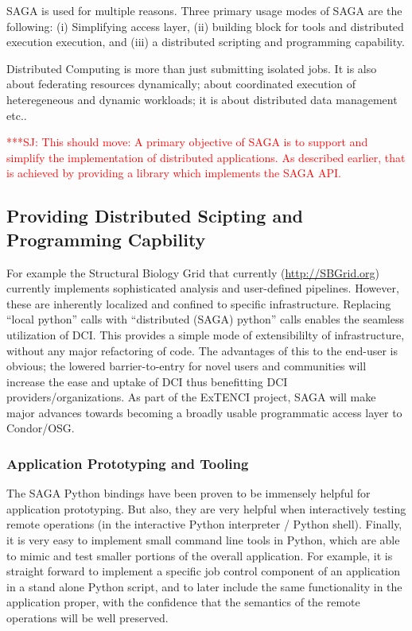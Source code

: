 \documentclass[12pt]{article}
\newcommand{\jhanote}[1]{ {\textcolor{red}     {***SJ: #1}}}
\newcommand{\jhanote}[1]{}
\begin{document}
SAGA is used for multiple reasons. Three primary usage modes of SAGA
are the following: (i) Simplifying access layer, (ii) building block
for tools and distributed execution execution, and (iii) a distributed
scripting and programming capability.

Distributed Computing is more than just submitting isolated jobs.  It
is also about federating resources dynamically; about coordinated
execution of heteregeneous and dynamic workloads; it is about
distributed data management etc..

\jhanote{This should move: A primary objective of SAGA is to support
  and simplify the implementation of distributed applications.  As
  described earlier, that is achieved by providing a library which
  implements the SAGA API.}


\subsection*{Providing Distributed Scipting and Programming
  Capbility} For example the Structural Biology Grid that currently
(\url{http://SBGrid.org}) currently implements sophisticated analysis
and user-defined pipelines. However, these are inherently localized
and confined to specific infrastructure.  Replacing ``local python''
calls with ``distributed (SAGA) python'' calls enables the seamless
utilization of DCI. This provides a simple mode of extensibililty of
infrastructure, without any major refactoring of code. The advantages
of this to the end-user is obvious; the lowered barrier-to-entry for
novel users and communities will increase the ease and uptake of DCI
thus benefitting DCI providers/organizations.  As part of the ExTENCI
project, SAGA will make major advances towards becoming a broadly
usable programmatic access layer to Condor/OSG.

\subsubsection*{Application Prototyping and Tooling}

   The SAGA Python bindings have been proven to be immensely helpful
   for application prototyping.  But also, they are very helpful when
   interactively testing remote operations (in the interactive Python
   interpreter / Python shell).  Finally, it is very easy to implement
   small command line tools in Python, which are able to mimic and
   test smaller portions of the overall application.  For example, it
   is straight forward to implement a specific job control component
   of an application in a stand alone Python script, and to later
   include the same functionality in the application proper, with the
   confidence that the semantics of the remote operations will be well
   preserved. %
\end{document}

